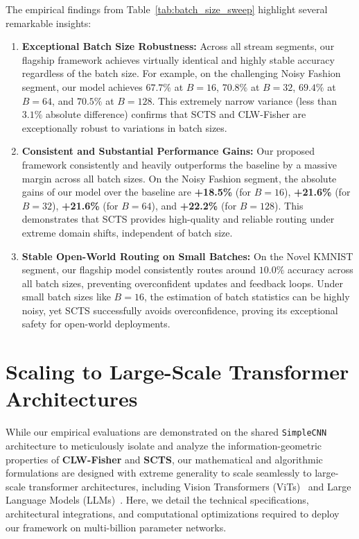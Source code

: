 \documentclass{article}
\theoremstyle{plain}
\theoremstyle{definition}
\theoremstyle{remark}
\begin{document}
The empirical findings from Table~\ref{tab:batch_size_sweep} highlight several remarkable insights:
\begin{enumerate}
  \item \textbf{Exceptional Batch Size Robustness:} Across all stream segments, our flagship framework achieves virtually identical and highly stable accuracy regardless of the batch size. For example, on the challenging Noisy Fashion segment, our model achieves $67.7\%$ at $B=16$, $70.8\%$ at $B=32$, $69.4\%$ at $B=64$, and $70.5\%$ at $B=128$. This extremely narrow variance (less than $3.1\%$ absolute difference) confirms that SCTS and CLW-Fisher are exceptionally robust to variations in batch sizes.
  \item \textbf{Consistent and Substantial Performance Gains:} Our proposed framework consistently and heavily outperforms the baseline by a massive margin across all batch sizes. On the Noisy Fashion segment, the absolute gains of our model over the baseline are \textbf{+18.5\%} (for $B=16$), \textbf{+21.6\%} (for $B=32$), \textbf{+21.6\%} (for $B=64$), and \textbf{+22.2\%} (for $B=128$). This demonstrates that SCTS provides high-quality and reliable routing under extreme domain shifts, independent of batch size.
  \item \textbf{Stable Open-World Routing on Small Batches:} On the Novel KMNIST segment, our flagship model consistently routes around $10.0\%$ accuracy across all batch sizes, preventing overconfident updates and feedback loops. Under small batch sizes like $B=16$, the estimation of batch statistics can be highly noisy, yet SCTS successfully avoids overconfidence, proving its exceptional safety for open-world deployments.
\end{enumerate}

\section{Scaling to Large-Scale Transformer Architectures}
\label{sec:appendix_scaling}

While our empirical evaluations are demonstrated on the shared \texttt{SimpleCNN} architecture to meticulously isolate and analyze the information-geometric properties of \textbf{CLW-Fisher} and \textbf{SCTS}, our mathematical and algorithmic formulations are designed with extreme generality to scale seamlessly to large-scale transformer architectures, including Vision Transformers (ViTs)~\cite{dosovitskiy2020vit} and Large Language Models (LLMs)~\cite{touvron2023llama}. Here, we detail the technical specifications, architectural integrations, and computational optimizations required to deploy our framework on multi-billion parameter networks.
\end{document}
